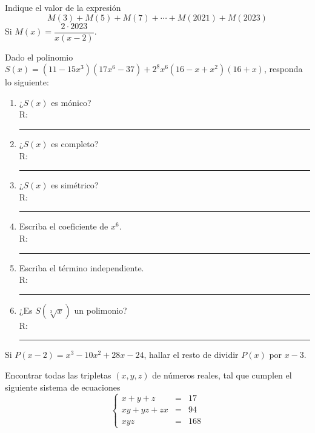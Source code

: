 \begin{section-problem}
    Indique el valor de la expresión
    \[M(3)  + M(5) + M(7) + \cdots + M(2021) + M(2023)\]
    Si $M(x) = \dfrac{2\cdot 2023}{x(x - 2)}$.
\end{section-problem}

\begin{section-problem}
    Dado el polinomio $S(x) = (11 - 15x^3)(17x^6 - 37) + 2^8 x^6 (16 - x + x^2)(16 + x)$, responda lo siguiente:
    \begin{multicols}{2}
        \begin{enumerate}
            \item ¿$S(x)$ es mónico? \\R: \rule{1cm}{0.1mm}
            \item ¿$S(x)$ es completo? \\R: \rule{1cm}{0.1mm}
            \item ¿$S(x)$ es simétrico? \\R: \rule{1cm}{0.1mm}
            \item Escriba el coeficiente de $x^6$. \\R: \rule{1cm}{0.1mm}
            \item Escriba el término independiente.\\ R: \rule{1cm}{0.1mm}
            \item ¿Es $S\left(\sqrt[3]{x}\right)$ un polimonio? \\ R: \rule{2cm}{0.1mm}
        \end{enumerate}
    \end{multicols}
\end{section-problem}

\begin{section-problem}
    Si $P(x - 2) = x^3 - 10x^2 + 28x - 24$, hallar el resto de dividir $P(x)$ por $x - 3$.
\end{section-problem}

\begin{section-problem}
    Encontrar todas las tripletas $(x, y, z)$ de números reales, tal que cumplen el siguiente sistema de ecuaciones
    \[
        \left\{
        \begin{array}{rcl}
            x + y + z & =& 17\\
            xy + yz + zx & =& 94\\
            x y z & =& 168
        \end{array}
        \right.
    \]
\end{section-problem}

